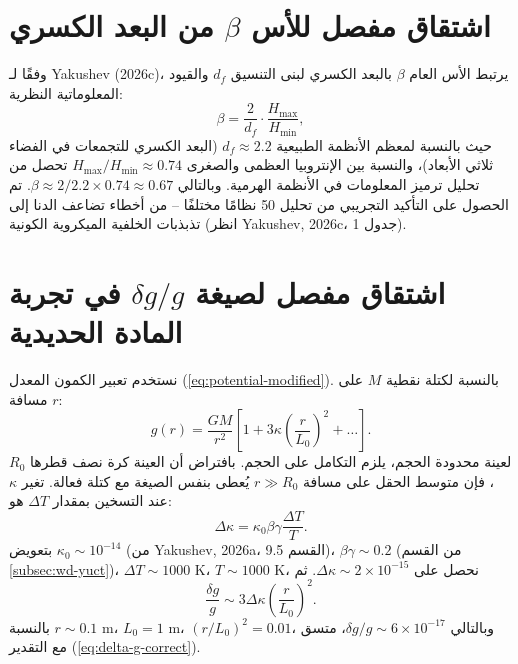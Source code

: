 \documentclass[11pt,a4paper]{article}
\newcommand{\df}{d_{\!f}}
\begin{document}
	\appendix
	
	\section{اشتقاق مفصل للأس $\beta$ من البعد الكسري}
	\label{app:beta-derivation}
	
	وفقًا لـ Yakushev (2026c)، يرتبط الأس العام $\beta$ بالبعد الكسري لبنى التنسيق $\df$ والقيود المعلوماتية النظرية:
	\begin{equation}
		\beta = \frac{2}{\df} \cdot \frac{H_{\text{max}}}{H_{\text{min}}},
		\label{eq:beta-derivation}
	\end{equation}
	حيث بالنسبة لمعظم الأنظمة الطبيعية $\df \approx 2.2$ (البعد الكسري للتجمعات في الفضاء ثلاثي الأبعاد)، والنسبة بين الإنتروبيا العظمى والصغرى $H_{\text{max}}/H_{\text{min}} \approx 0.74$ تحصل من تحليل ترميز المعلومات في الأنظمة الهرمية. وبالتالي $\beta \approx 2/2.2 \times 0.74 \approx 0.67$. تم الحصول على التأكيد التجريبي من تحليل 50 نظامًا مختلفًا – من أخطاء تضاعف الدنا إلى تذبذبات الخلفية الميكروية الكونية (انظر Yakushev, 2026c، جدول 1).
	
	\section{اشتقاق مفصل لصيغة $\delta g/g$ في تجربة المادة الحديدية}
	\label{app:delta-g-derivation}
	
	نستخدم تعبير الكمون المعدل (\ref{eq:potential-modified}). بالنسبة لكتلة نقطية $M$ على مسافة $r$:
	\begin{equation}
		g(r) = \frac{GM}{r^2} \left[ 1 + 3\kappa \left( \frac{r}{L_0} \right)^2 + \dots \right].
		\label{eq:g-modified}
	\end{equation}
	لعينة محدودة الحجم، يلزم التكامل على الحجم. بافتراض أن العينة كرة نصف قطرها $R_0$، فإن متوسط الحقل على مسافة $r \gg R_0$ يُعطى بنفس الصيغة مع كتلة فعالة. تغير $\kappa$ عند التسخين بمقدار $\Delta T$ هو:
	\begin{equation}
		\Delta\kappa = \kappa_0 \beta\gamma \frac{\Delta T}{T}.
		\label{eq:delta-kappa}
	\end{equation}
	بتعويض $\kappa_0 \sim 10^{-14}$ (من Yakushev, 2026a، القسم 9.5)، $\beta\gamma \sim 0.2$ (من القسم \ref{subsec:wd-yuct})، $\Delta T \sim 1000$ K، $T \sim 1000$ K، نحصل على $\Delta\kappa \sim 2\times10^{-15}$. ثم
	\begin{equation}
		\frac{\delta g}{g} \sim 3\Delta\kappa \left( \frac{r}{L_0} \right)^2.
		\label{eq:delta-g-final}
	\end{equation}
	بالنسبة $r \sim 0.1$ m، $L_0 = 1$ m، $(r/L_0)^2 = 0.01$، وبالتالي $\delta g/g \sim 6\times10^{-17}$، متسق مع التقدير (\ref{eq:delta-g-correct}).
	
\end{document}

